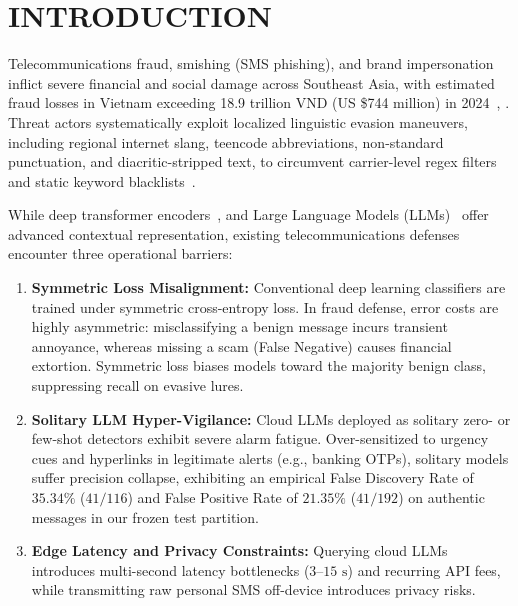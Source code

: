 \section{INTRODUCTION}
\label{sec:intro}

Telecommunications fraud, smishing (SMS phishing), and brand impersonation inflict severe financial and social damage across Southeast Asia, with estimated fraud losses in Vietnam exceeding 18.9 trillion VND (US \$744 million) in 2024~\cite{vietnamnet2024scams}, \cite{mst2024scams}. Threat actors systematically exploit localized linguistic evasion maneuvers, including regional internet slang, teencode abbreviations, non-standard punctuation, and diacritic-stripped text, to circumvent carrier-level regex filters and static keyword blacklists~\cite{seo2024ondevice}.

While deep transformer encoders~\cite{nguyen2020phobert}, \cite{nguyen2023visobert} and Large Language Models (LLMs)~\cite{saias2025advances} offer advanced contextual representation, existing telecommunications defenses encounter three operational barriers:
\begin{enumerate}
    \item \textbf{Symmetric Loss Misalignment:} Conventional deep learning classifiers are trained under symmetric cross-entropy loss. In fraud defense, error costs are highly asymmetric: misclassifying a benign message incurs transient annoyance, whereas missing a scam (False Negative) causes financial extortion. Symmetric loss biases models toward the majority benign class, suppressing recall on evasive lures.
    \item \textbf{Solitary LLM Hyper-Vigilance:} Cloud LLMs deployed as solitary zero- or few-shot detectors exhibit severe alarm fatigue. Over-sensitized to urgency cues and hyperlinks in legitimate alerts (e.g., banking OTPs), solitary models suffer precision collapse, exhibiting an empirical False Discovery Rate of $35.34\%$ ($41/116$) and False Positive Rate of $21.35\%$ ($41/192$) on authentic messages in our frozen test partition.
    \item \textbf{Edge Latency and Privacy Constraints:} Querying cloud LLMs introduces multi-second latency bottlenecks ($3\text{--}15\text{ s}$) and recurring API fees, while transmitting raw personal SMS off-device introduces privacy risks.
\end{enumerate}


